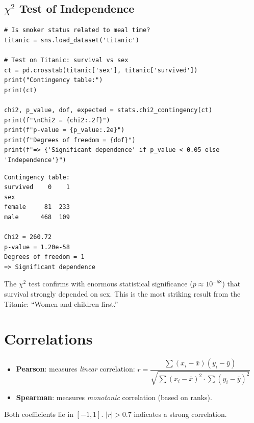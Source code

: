 \subsection{$\chi^2$ Test of Independence}

\begin{codeblock}[title=\textbf{Python}]
\begin{verbatim}
# Is smoker status related to meal time?
titanic = sns.load_dataset('titanic')

# Test on Titanic: survival vs sex
ct = pd.crosstab(titanic['sex'], titanic['survived'])
print("Contingency table:")
print(ct)

chi2, p_value, dof, expected = stats.chi2_contingency(ct)
print(f"\nChi2 = {chi2:.2f}")
print(f"p-value = {p_value:.2e}")
print(f"Degrees of freedom = {dof}")
print(f"=> {'Significant dependence' if p_value < 0.05 else 'Independence'}")
\end{verbatim}
\end{codeblock}

\begin{codeoutput}
\begin{verbatim}
Contingency table:
survived    0    1
sex
female     81  233
male      468  109

Chi2 = 260.72
p-value = 1.20e-58
Degrees of freedom = 1
=> Significant dependence
\end{verbatim}
\end{codeoutput}

\begin{remark}
The $\chi^2$ test confirms with enormous statistical significance ($p \approx 10^{-58}$) that survival strongly depended on sex. This is the most striking result from the Titanic: ``Women and children first.''
\end{remark}

\section{Correlations}

\begin{definition}
\begin{itemize}
    \item \textbf{Pearson}: measures \emph{linear} correlation:
    $r = \dfrac{\sum(x_i - \bar{x})(y_i - \bar{y})}{\sqrt{\sum(x_i - \bar{x})^2 \cdot \sum(y_i - \bar{y})^2}}$
    \item \textbf{Spearman}: measures \emph{monotonic} correlation (based on ranks).
\end{itemize}
Both coefficients lie in $[-1, 1]$. $|r| > 0.7$ indicates a strong correlation.
\end{definition}

